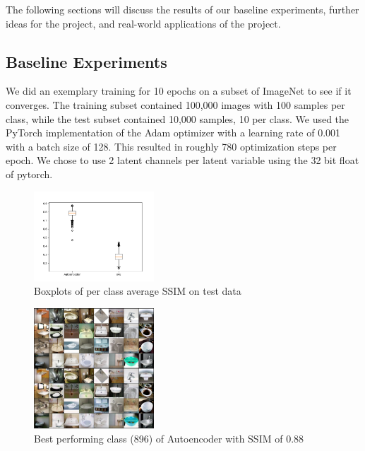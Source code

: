 The following sections will discuss the results of our baseline experiments, further ideas for the project, and real-world applications of the project.

\subsection{Baseline Experiments}\label{subsec:baseline-results}
We did an exemplary training for 10 epochs on a subset of ImageNet to see if it converges.
The training subset contained 100,000 images with 100 samples per class, while the test subset contained 10,000 samples, 10 per class.
We used the PyTorch implementation of the Adam optimizer with a learning rate of 0.001 with a batch size of 128.
This resulted in roughly 780 optimization steps per epoch.
We chose to use 2 latent channels per latent variable using the 32 bit float of pytorch.

\begin{figure}
    \centering
    \includegraphics[width=0.4\textwidth]{../../sample_images/evaluation/boxplot_ae_and_vae}
    \caption{Boxplots of per class average SSIM on test data}
    \label{fig:boxplots}
\end{figure}

\begin{figure}
    \centering
    \includegraphics[width=0.4\textwidth]{../../sample_images/evaluation/MAX_AE_IDX_896}
    \caption{Best performing class (896) of Autoencoder with SSIM of 0.88}
    \label{fig:imnet_best_perf_ae}
\end{figure}

